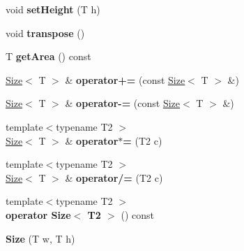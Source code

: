 \begin{DoxyCompactItemize}
\item 
\hypertarget{class_size_a31c905c24fc46fd7fb0ead3b27c883bf}{
void {\bfseries setHeight} (T h)}
\label{class_size_a31c905c24fc46fd7fb0ead3b27c883bf}

\item 
\hypertarget{class_size_ad4fe5e5347033c30961bf0bb68e2f2db}{
void {\bfseries transpose} ()}
\label{class_size_ad4fe5e5347033c30961bf0bb68e2f2db}

\item 
\hypertarget{class_size_adb5d429e93a45a4711a34a1b1b5d979f}{
T {\bfseries getArea} () const }
\label{class_size_adb5d429e93a45a4711a34a1b1b5d979f}

\item 
\hypertarget{class_size_a0ce6047fd3c0a883acd287b5b34d083b}{
\hyperlink{class_size}{Size}$<$ T $>$ \& {\bfseries operator+=} (const \hyperlink{class_size}{Size}$<$ T $>$ \&)}
\label{class_size_a0ce6047fd3c0a883acd287b5b34d083b}

\item 
\hypertarget{class_size_a9f6d6f2e34d1d3ff3c288bb25e08ad8f}{
\hyperlink{class_size}{Size}$<$ T $>$ \& {\bfseries operator-\/=} (const \hyperlink{class_size}{Size}$<$ T $>$ \&)}
\label{class_size_a9f6d6f2e34d1d3ff3c288bb25e08ad8f}

\item 
\hypertarget{class_size_aab38c063fa04e4f22cfccab0f6417433}{
{\footnotesize template$<$typename T2 $>$ }\\\hyperlink{class_size}{Size}$<$ T $>$ \& {\bfseries operator$\ast$=} (T2 c)}
\label{class_size_aab38c063fa04e4f22cfccab0f6417433}

\item 
\hypertarget{class_size_ae23ef0c1e3fc6bd7054d6553fb6e8a00}{
{\footnotesize template$<$typename T2 $>$ }\\\hyperlink{class_size}{Size}$<$ T $>$ \& {\bfseries operator/=} (T2 c)}
\label{class_size_ae23ef0c1e3fc6bd7054d6553fb6e8a00}

\item 
\hypertarget{class_size_ae7c404e21e544f5e95a194a03c84f251}{
{\footnotesize template$<$typename T2 $>$ }\\{\bfseries operator Size$<$ T2 $>$} () const }
\label{class_size_ae7c404e21e544f5e95a194a03c84f251}

\item 
\hypertarget{class_size_af1c5ad71aa40371fa62aa71ee81c3dde}{
{\bfseries Size} (T w, T h)}
\label{class_size_af1c5ad71aa40371fa62aa71ee81c3dde}


\end{DoxyCompactItemize}
